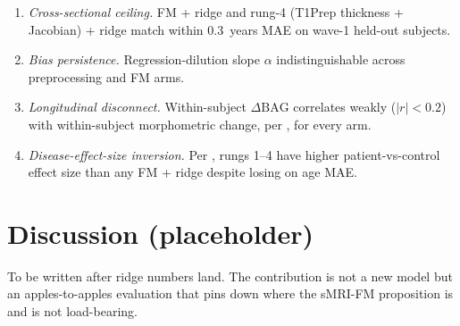 \documentclass[11pt]{article}
\begin{document}
\begin{enumerate}
  \item \emph{Cross-sectional ceiling.} FM + ridge and rung-4 (T1Prep
    thickness + Jacobian) + ridge match within \SI{0.3}{years} MAE on
    wave-1 held-out subjects.
  \item \emph{Bias persistence.} Regression-dilution slope $\alpha$
    indistinguishable across preprocessing and FM arms.
  \item \emph{Longitudinal disconnect.} Within-subject $\Delta\mathrm{BAG}$
    correlates weakly ($|r| < 0.2$) with within-subject morphometric
    change, per \citet{vidalpineiro2021}, for every arm.
  \item \emph{Disease-effect-size inversion.} Per \citet{schulz2025},
    rungs 1--4 have higher patient-vs-control effect size than any
    FM + ridge despite losing on age MAE.
\end{enumerate}

\section{Discussion (placeholder)}

To be written after ridge numbers land. The contribution is not a new
model but an apples-to-apples evaluation that pins down where the
sMRI-FM proposition is and is not load-bearing.



\end{document}
